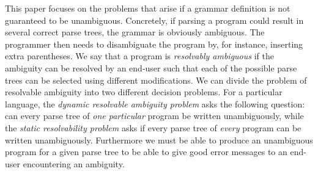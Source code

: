 \documentclass[runningheads]{llncs}
\begin{document}



This paper focuses on the problems that arise if a grammar definition
is not guaranteed to be unambiguous. Concretely, if parsing a program
could result in several correct parse trees, the grammar is obviously
ambiguous. The programmer then needs to disambiguate the program by,
for instance, inserting extra parentheses. We say that a program is
\emph{resolvably ambiguous} if the ambiguity can be resolved by
an end-user such that each of the possible parse trees can
be selected using different modifications.
%
We can divide the problem of resolvable ambiguity into two
different decision problems.
For a particular language, the \emph{dynamic resolvable ambiguity problem} asks the following question: can every parse tree of \emph{one particular} program be written unambiguously, while the \emph{static resolvability problem} asks if every parse tree of \emph{every} program can be written unambiguously. Furthermore we must be able to produce an unambiguous program for a given parse tree to be able to give good error messages to an end-user encountering an ambiguity.
\end{document}
